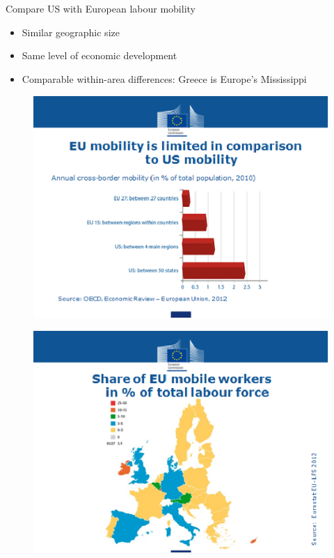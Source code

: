 \documentclass{beamer}
\begin{document}
\begin{frame} 
  Compare US with European labour mobility  
  \begin{itemize}
    \item Similar geographic size
    \item Same level of economic development
    \item Comparable within-area differences: Greece is Europe's Mississippi
  \end{itemize}
\end{frame}

\begin{frame}
  \begin{figure}
    \includegraphics[scale=.7]{eu_labour.eps}
  \end{figure}
\end{frame}

\begin{frame}
  \begin{figure}
    \includegraphics[scale=.7]{eu_labour2.eps}
  \end{figure}
\end{frame}
\end{document}
